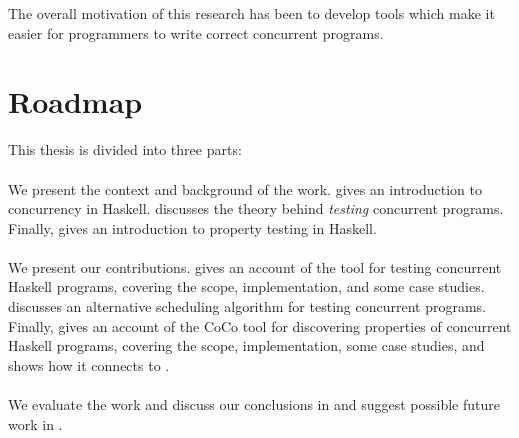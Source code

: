 The overall motivation of this research has been to develop tools
which make it easier for programmers to write correct concurrent
programs.

\section{Roadmap}
\label{sec:intro-roadmap}

This thesis is divided into three parts:

\paragraph{}
We present the context and background of the work.
 gives an introduction to concurrency in
Haskell.   discusses the theory behind \emph{testing}
concurrent programs.  Finally,  gives an
introduction to property testing in Haskell.

\paragraph{}
We present our contributions.   gives an account of
the \dejafu{} tool for testing concurrent Haskell programs, covering
the scope, implementation, and some case studies.
 discusses an alternative scheduling algorithm
for testing concurrent programs.  Finally,  gives an
account of the CoCo tool for discovering properties of concurrent
Haskell programs, covering the scope, implementation, some case
studies, and shows how it connects to \dejafu{}.

\paragraph{}
We evaluate the work and discuss our conclusions in
 and suggest possible future work in
.
